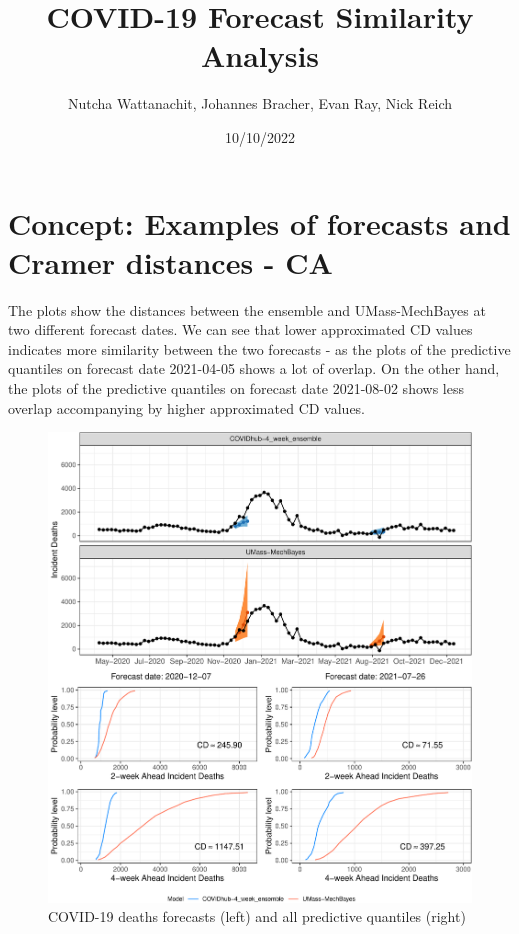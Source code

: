 \documentclass[
]{article}
\title{COVID-19 Forecast Similarity Analysis}
\author{Nutcha Wattanachit, Johannes Bracher, Evan Ray, Nick Reich}
\date{10/10/2022}
\begin{document}
\maketitle

\hypertarget{concept-examples-of-forecasts-and-cramer-distances---ca}{%
\section{Concept: Examples of forecasts and Cramer distances -
CA}\label{concept-examples-of-forecasts-and-cramer-distances---ca}}

The plots show the distances between the ensemble and UMass-MechBayes at
two different forecast dates. We can see that lower approximated CD
values indicates more similarity between the two forecasts - as the
plots of the predictive quantiles on forecast date 2021-04-05 shows a
lot of overlap. On the other hand, the plots of the predictive quantiles
on forecast date 2021-08-02 shows less overlap accompanying by higher
approximated CD values.

\begin{figure}

{\centering \includegraphics{sim_analysis_5_files/figure-latex/concept_ca-1} 

}

\caption{COVID-19 deaths forecasts (left) and all predictive quantiles (right)}\label{fig:concept_ca}
\end{figure}
\end{document}
